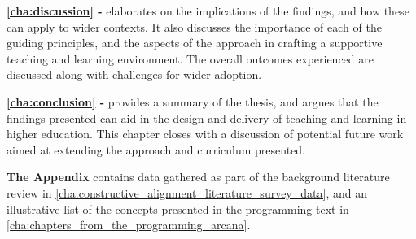 

\textbf{\cref{cha:discussion} - } elaborates on the implications of the findings, and how these can apply to wider contexts. It also discusses the importance of each of the guiding principles, and the aspects of the approach in crafting a supportive teaching and learning environment. The overall outcomes experienced are discussed along with challenges for wider adoption. 

\textbf{\cref{cha:conclusion} - } provides a summary of the thesis, and argues that the findings presented can aid in the design and delivery of teaching and learning in higher education. This chapter closes with a discussion of potential future work aimed at extending the approach and curriculum presented.

\textbf{The Appendix} contains data gathered as part of the background literature review in \cref{cha:constructive_alignment_literature_survey_data}, and an illustrative list of the concepts presented in the programming text in \cref{cha:chapters_from_the_programming_arcana}.




